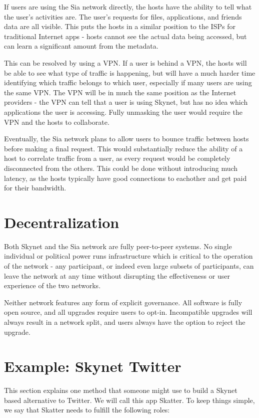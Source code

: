 \documentclass[twocolumn]{article}
\begin{document}
If users are using the Sia network directly, the hosts have the ability to tell
what the user's activities are. The user's requests for files, applications, and
friends data are all visible. This puts the hosts in a similar position to the
ISPs for traditional Internet apps - hosts cannot see the actual data being
accessed, but can learn a significant amount from the metadata.

This can be resolved by using a VPN. If a user is behind a VPN, the hosts will
be able to see what type of traffic is happening, but will have a much harder
time identifying which traffic belongs to which user, especially if many users
are using the same VPN. The VPN will be in much the same position as the
Internet providers - the VPN can tell that a user is using Skynet, but has no
idea which applications the user is accessing. Fully unmasking the user would
require the VPN and the hosts to collaborate.

Eventually, the Sia network plans to allow users to bounce traffic between hosts
before making a final request. This would substantially reduce the ability of a
host to correlate traffic from a user, as every request would be completely
disconnected from the others. This could be done without introducing much
latency, as the hosts typically have good connections to eachother and get paid
for their bandwidth.

\section{Decentralization}
Both Skynet and the Sia network are fully peer-to-peer systems. No single
individual or political power runs infrastructure which is critical to the
operation of the network - any participant, or indeed even large subsets of
participants, can leave the network at any time without disrupting the
effectiveness or user experience of the two networks.

Neither network features any form of explicit governance. All software is fully
open source, and all upgrades require users to opt-in. Incompatible upgrades
will always result in a network split, and users always have the option to
reject the upgrade.

\section{Example: Skynet Twitter}
This section explains one method that someone might use to build a Skynet based
alternative to Twitter. We will call this app Skatter. To keep things simple, we
say that Skatter needs to fulfill the following roles:
\end{document}
